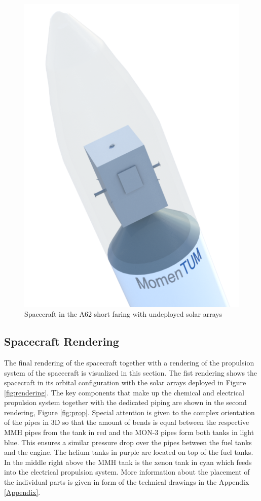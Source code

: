 \documentclass[conference]{IEEEtran}
\begin{document}
\begin{figure}[H]
  \centering
  \includegraphics[width=1\linewidth]{img/Faring.PNG}
  \caption{Spacecraft in the A62 short faring with undeployed solar arrays}
  \label{fig:faring}
\end{figure}


\subsection{Spacecraft Rendering}

The final rendering of the spacecraft together with a rendering of the propulsion system of the spacecraft is visualized in this section. The fist rendering shows the spacecraft in its orbital configuration with the solar arrays deployed in Figure  \ref{fig:rendering}. The key components that make up the chemical and electrical propulsion system together with the dedicated piping are shown in the second rendering, Figure \ref{fig:prop}. Special attention is given to the complex orientation of the pipes in 3D so that the amount of bends is equal between the respective MMH pipes from the tank in red and the MON-3 pipes form both tanks in light blue. This ensures a similar pressure drop over the pipes between the fuel tanks and the engine. The helium tanks in purple are located on top of the fuel tanks. In the middle right above the MMH tank is the xenon tank in cyan which feeds into the electrical propulsion system. More information about the placement of the individual parts is given in form of the technical drawings in the Appendix \ref{Appendix}.
\end{document}
